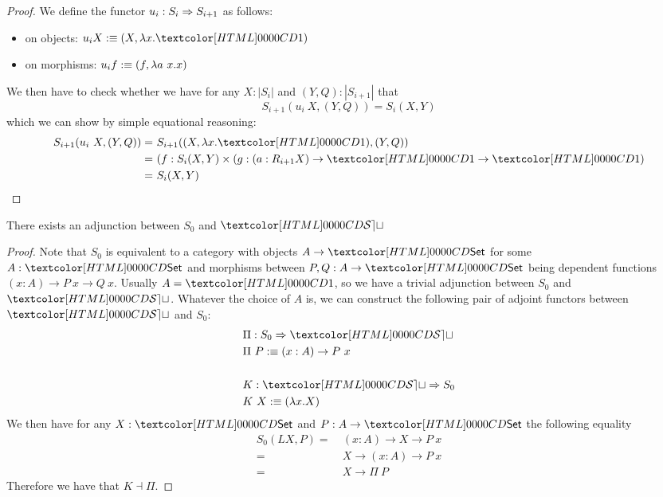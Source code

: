 \begin{proof}
  We define the functor $u_i : S_i \Rightarrow S_{i+1}$ as follows:
  \begin{itemize}
  \item on objects: $u_i X \ddefeq (X , \lambda x . \unitty)$
  \item on morphisms: $u_i f :\equiv (f , \lambda a\ x . x)$
  \end{itemize}
  We then have to check whether we have for any $X : | S_i |$ and
  $(Y,Q) : | S_{i+1} |$ that
  $$
  S_{i+1}(u_i\ X , (Y,Q)) = S_i(X,Y)
  $$
  which we can show by simple equational reasoning:
  \begin{align*}
    S_{i+1}(u_i\ X , (Y,Q)) =&\ S_{i+1}((X,\lambda x . \unitty), (Y,Q)) \\
    =&\ (f : S_i(X,Y) \times (g : (a : R_{i+1} X) \to \unitty \to \unitty) \\
    =&\ S_i(X,Y)
  \end{align*}

\end{proof}

\begin{proposition}
  \label{first-sort-adjoint-to-set}

  There exists an adjunction between $S_0$ and $\SET$
\end{proposition}

\begin{proof}
  Note that $S_0$ is equivalent to a category with objects
  $A \to \Set$ for some $A : \Set$ and morphisms between
  $P, Q : A \to \Set$ being dependent functions
  $(x : A) \to P\ x \to Q\ x$. Usually $A = \unitty$, so we have a
  trivial adjunction between $S_0$ and $\SET$. Whatever the choice of
  $A$ is, we can construct the following pair of adjoint functors
  between $\SET$ and $S_0$:
  \begin{align*}
    &\Pi : \Func{S_0}{\SET} \\
    &\Pi\ P \ddefeq (x : A) \to P\ x \\
    \\
    &K : \Func{\SET}{S_0} \\
    &K\ X \ddefeq (\lambda x . X)
  \end{align*}
  We then have for any $X : \Set$ and $P : A \to \Set$ the following equality
  \begin{align*}
    S_0(LX , P) =&\ (x : A) \to X \to P\ x \\
    =&\ X \to (x : A) \to P\ x \\
    =&\ X \to \Pi\ P
  \end{align*}
  Therefore we have that $K \dashv \Pi$.
\end{proof}

